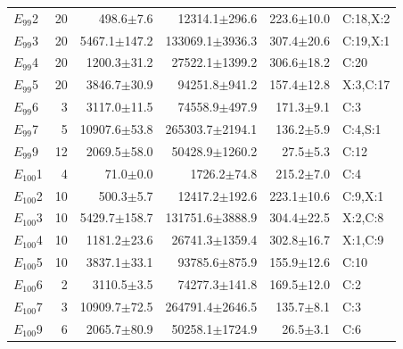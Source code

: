 \begin{supertabular}{@{}lrrrrl@{}}
$E_{99}$2 & 20 & 498.6$\pm$7.6 & 12314.1$\pm$296.6 & 223.6$\pm$10.0 & C:18,X:2 \\
$E_{99}$3 & 20 & 5467.1$\pm$147.2 & 133069.1$\pm$3936.3 & 307.4$\pm$20.6 & C:19,X:1 \\
$E_{99}$4 & 20 & 1200.3$\pm$31.2 & 27522.1$\pm$1399.2 & 306.6$\pm$18.2 & C:20 \\
$E_{99}$5 & 20 & 3846.7$\pm$30.9 & 94251.8$\pm$941.2 & 157.4$\pm$12.8 & X:3,C:17 \\
$E_{99}$6 & 3 & 3117.0$\pm$11.5 & 74558.9$\pm$497.9 & 171.3$\pm$9.1 & C:3 \\
$E_{99}$7 & 5 & 10907.6$\pm$53.8 & 265303.7$\pm$2194.1 & 136.2$\pm$5.9 & C:4,S:1 \\
$E_{99}$9 & 12 & 2069.5$\pm$58.0 & 50428.9$\pm$1260.2 & 27.5$\pm$5.3 & C:12 \\
$E_{100}$1 & 4 & 71.0$\pm$0.0 & 1726.2$\pm$74.8 & 215.2$\pm$7.0 & C:4 \\
$E_{100}$2 & 10 & 500.3$\pm$5.7 & 12417.2$\pm$192.6 & 223.1$\pm$10.6 & C:9,X:1 \\
$E_{100}$3 & 10 & 5429.7$\pm$158.7 & 131751.6$\pm$3888.9 & 304.4$\pm$22.5 & X:2,C:8 \\
$E_{100}$4 & 10 & 1181.2$\pm$23.6 & 26741.3$\pm$1359.4 & 302.8$\pm$16.7 & X:1,C:9 \\
$E_{100}$5 & 10 & 3837.1$\pm$33.1 & 93785.6$\pm$875.9 & 155.9$\pm$12.6 & C:10 \\
$E_{100}$6 & 2 & 3110.5$\pm$3.5 & 74277.3$\pm$141.8 & 169.5$\pm$12.0 & C:2 \\
$E_{100}$7 & 3 & 10909.7$\pm$72.5 & 264791.4$\pm$2646.5 & 135.7$\pm$8.1 & C:3 \\
$E_{100}$9 & 6 & 2065.7$\pm$80.9 & 50258.1$\pm$1724.9 & 26.5$\pm$3.1 & C:6 \\
\end{supertabular}
\endgroup
